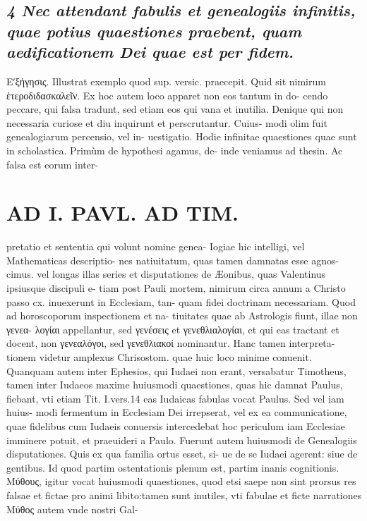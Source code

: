 \documentclass{article}
\begin{document}
\begin{pages}
\subsection*{\textit{4 Nec attendant fabulis et genealogiis infinitis, quae potius quaestiones praebent, quam aedificationem Dei quae est per fidem. }}\pstart Εʹξήγησις. Illustrat exemplo quod sup. versic. praecepit. Quid sit nimirum ἑτεροδιδασκαλεῖν. Ex hoc autem loco apparet non eos tantum in do- cendo peccare, qui falsa tradunt, sed etiam eos qui vana et inutilia. Denique qui non necessaria curiose et diu inquirunt et perscrutantur. Cuius- modi olim fuit genealogiarum percensio, vel in- uestigatio. Hodie infinitae quaestiones quae sunt in scholastica. Primùm de hypothesi agamus, de- inde veniamus ad thesin. Ac falsa est eorum inter-  \pend
\section*{AD I. PAVL. AD TIM. }
\marginpar{[ p.1O ]}\pstart pretatio et sententia qui volunt nomine genea- Iogiae hic intelligi, vel Mathematicas descriptio- nes natiuitatum, quas tamen damnatas esse agnos- cimus. vel longas illas series et disputationes de Æonibus, quas Valentinus ipsiusque discipuli e- tiam post Pauli mortem, nimirum circa annum a Christo passo cx. inuexerunt in Ecclesiam, tan- quam fidei doctrinam necessariam.  \pend\pstart Quod ad horoscoporum inspectionem et na- tiuitates quae ab Astrologis fiunt, illae non γενεα- λογίαι appellantur, sed γενέσεις et γενεθλιαλογίαι, et qui eas tractant et docent, non γενεαλόγοι, sed γενεθλιακοί nominantur. Hanc tamen interpreta- tionem videtur amplexus Chrisostom. quae huic loco minime conuenit.  \pend\pstart Quanquam autem inter Ephesios, qui Iudaei non erant, versabatur Timotheus, tamen inter Iudaeos maxime huiusmodi quaestiones, quas hic damnat Paulus, fiebant, vti etiam Tit. I.vers.14 eas Iudaicas fabulas vocat Paulus. Sed vel iam huius- modi fermentum in Ecclesiam Dei irrepserat, vel ex ea communicatione, quae fidelibus cum Iudaeis conuersis intercedebat hoc periculum iam Ecclesiae imminere potuit, et praeuideri a Paulo.  \pend\pstart Fuerunt autem huiusmodi de Genealogiis disputationes. Quis ex qua familia ortus esset, si- ue de se Iudaei agerent: siue de gentibus. Id quod partim ostentationis plenum est, partim inanis cognitionis.  \pend\pstart Μύθους, igitur vocat huiusmodi quaestiones, quod etsi saepe non sint prorsus res falsae et fictae pro animi libito:tamen sunt inutiles, vti fabulae et ficte narrationes Μύθος autem vnde nostri Gal-  \pend

\end{pages}
\end{document}
